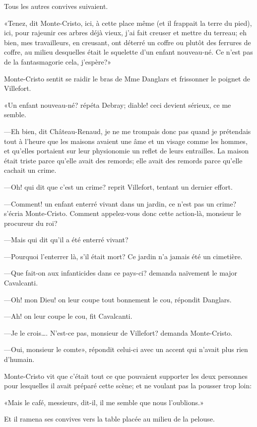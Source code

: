 Tous les autres convives suivaient. 

«Tenez, dit Monte-Cristo, ici, à cette place même (et il frappait la terre du pied), ici, pour rajeunir ces arbres déjà vieux, j'ai fait creuser et mettre du terreau; eh bien, mes travailleurs, en creusant, ont déterré un coffre ou plutôt des ferrures de coffre, au milieu desquelles était le squelette d'un enfant nouveau-né. Ce n'est pas de la fantasmagorie cela, j'espère?» 

Monte-Cristo sentit se raidir le bras de Mme Danglars et frissonner le poignet de Villefort. 

«Un enfant nouveau-né? répéta Debray; diable! ceci devient sérieux, ce me semble. 

—Eh bien, dit Château-Renaud, je ne me trompais donc pas quand je prétendais tout à l'heure que les maisons avaient une âme et un visage comme les hommes, et qu'elles portaient sur leur physionomie un reflet de leurs entrailles. La maison était triste parce qu'elle avait des remords; elle avait des remords parce qu'elle cachait un crime. 

—Oh! qui dit que c'est un crime? reprit Villefort, tentant un dernier effort. 

—Comment! un enfant enterré vivant dans un jardin, ce n'est pas un crime? s'écria Monte-Cristo. Comment appelez-vous donc cette action-là, monsieur le procureur du roi? 

—Mais qui dit qu'il a été enterré vivant? 

—Pourquoi l'enterrer là, s'il était mort? Ce jardin n'a jamais été un cimetière. 

—Que fait-on aux infanticides dans ce pays-ci? demanda naïvement le major Cavalcanti. 

—Oh! mon Dieu! on leur coupe tout bonnement le cou, répondit Danglars. 

—Ah! on leur coupe le cou, fit Cavalcanti. 

—Je le crois\dots. N'est-ce pas, monsieur de Villefort? demanda Monte-Cristo. 

—Oui, monsieur le comte», répondit celui-ci avec un accent qui n'avait plus rien d'humain. 

Monte-Cristo vit que c'était tout ce que pouvaient supporter les deux personnes pour lesquelles il avait préparé cette scène; et ne voulant pas la pousser trop loin: 

«Mais le café, messieurs, dit-il, il me semble que nous l'oublions.» 

Et il ramena ses convives vers la table placée au milieu de la pelouse. 

